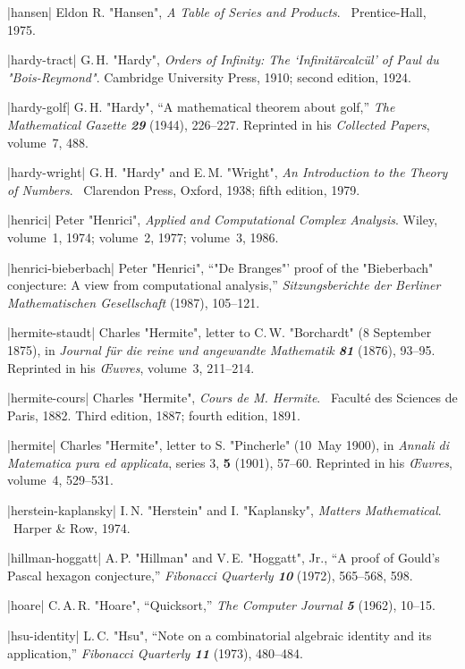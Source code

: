 \bib|hansen|%
Eldon R. "Hansen", {\sl A Table of Series and Products}. \
Prentice-Hall, 1975.

\bib|hardy-tract|%
G.\,H. "Hardy", {\sl Orders of Infinity: The `Infinit\"arcalc\"ul' of
Paul du "Bois-Reymond"}. Cambridge University Press, 1910;
second edition, 1924.

\bib|hardy-golf|%
G.\,H. "Hardy", ``A mathematical theorem about golf,''
{\sl The Mathematical Gazette\/ \bf29} (1944), 226--227. Reprinted
in his {\sl Collected Papers}, volume~7, 488.

\bib|hardy-wright|%
G.\,H. "Hardy" and E.\,M. "Wright", {\sl An Introduction to the Theory of
Numbers}. \ Clarendon Press, Oxford, 1938; fifth edition, 1979.

\bib|henrici|%
Peter "Henrici", {\sl Applied and Computational Complex Analysis}.
Wiley, volume~1, 1974; volume~2, 1977; volume~3, 1986.

\bib|henrici-bieberbach|%
Peter "Henrici", ``"De Branges"' proof of the "Bieberbach" conjecture:
A view from computational analysis,'' {\sl Sitzungsberichte der
Berliner Mathematischen Gesellschaft\/} (1987), 105--121.

\bib|hermite-staudt|%
Charles "Hermite", letter to C.\,W. "Borchardt" (8 September 1875), in
{\sl Journal f\"ur die reine und angewandte Mathematik\/ \bf81}
 (1876), 93--95. Reprinted in his
{\sl \OE uvres}, volume~3, 211--214.

\bib|hermite-cours|%
Charles "Hermite", {\sl Cours de M. Hermite}. \
Facult\'e des Sciences de Paris, 1882. Third edition, 1887; fourth edition, 1891.

\bib|hermite|%
Charles "Hermite", letter to S. "Pincherle" (10~May 1900), in
{\sl Annali di Matematica pura ed applicata}, series 3, {\bf5}
(1901), 57--60. Reprinted in his
{\sl \OE uvres}, volume~4, 529--531.

\bib|herstein-kaplansky|%
I.\,N. "Herstein" and I. "Kaplansky", {\sl Matters Mathematical}. \
Harper \& Row, 1974.

\bib|hillman-hoggatt|%
A.\,P. "Hillman" and V.\,E. "Hoggatt", Jr., ``A proof of Gould's Pascal
hexagon conjecture,'' {\sl Fibonacci Quarterly\/ \bf10} (1972), 565--568, 598.

\bib|hoare|%
C.\,A.\,R. "Hoare", ``Quicksort,''
{\sl The Computer Journal\/ \bf5} (1962), 10--15.

\bib|hsu-identity|%
L.\,C. "Hsu", ``Note on a combinatorial algebraic identity and its application,''
{\sl Fibonacci Quarterly\/ \bf11} (1973), 480--484.

